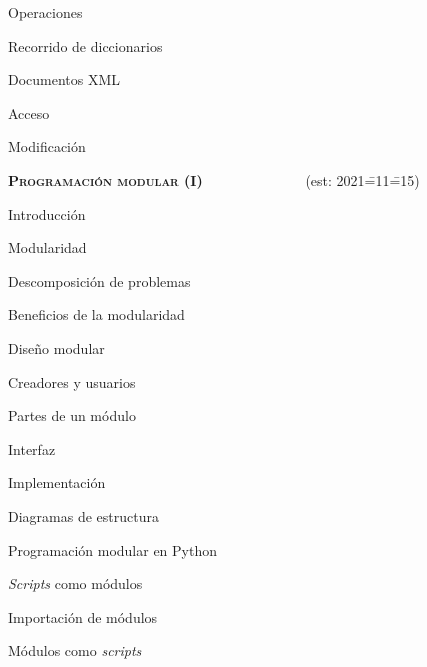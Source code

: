 \begin{longenum}
\begin{longenum}
\begin{longenum}
            \begin{longenum}
                \item Operaciones
                \item Recorrido de diccionarios
            \end{longenum}
            \item Documentos XML
            \begin{longenum}
                \item Acceso
                \item Modificación
            \end{longenum}
        \end{longenum}
    \end{longenum}
    \item \textbf{\textsc{Programación modular (I)}} \ \ \ \ \ \ \ \ \ \ \ \ \ \ (est: 2021\==11\==15)
    \begin{longenum}
        \item Introducción
        \begin{longenum}
            \item Modularidad
            \item Descomposición de problemas
            \item Beneficios de la modularidad
        \end{longenum}
        \item Diseño modular
        \begin{longenum}
            \item Creadores y usuarios
            \item Partes de un módulo
            \begin{longenum}
                \item Interfaz
                \item Implementación
            \end{longenum}
            \item Diagramas de estructura
        \end{longenum}
        \item Programación modular en Python
        \begin{longenum}
            \item \textit{Scripts} como módulos
            \item Importación de módulos
            \item Módulos como \textit{scripts}

\end{longenum}
\end{longenum}
\end{longenum}
